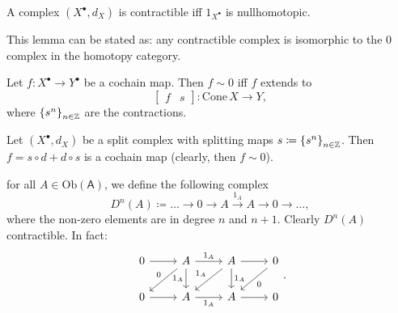 \begin{lem}
	A complex $\left( X^{\bullet}, d_{X} \right)$ is contractible iff
	$1_{X^\bullet}$ is nullhomotopic.
\end{lem}
\begin{rem}[]
	This lemma can be stated as: any contractible complex is isomorphic to
	the $0$ complex in the homotopy category.
\end{rem}

\begin{lem}
	Let $f\colon X^\bullet \to Y^\bullet$ be a cochain map.
	Then $f \sim 0$ iff $f$ extends to
	\begin{equation}
		\begin{bmatrix}
			f & s
		\end{bmatrix} 
		\colon \mathrm{Cone}\, X \to Y
	,\end{equation} 
	where $\left\{ s^n \right\}_{n \in \mathbb{Z}}$ are the contractions.
\end{lem} 

\begin{lem}
	Let $\left( X^{\bullet}, d_{X} \right)$ be a split complex
	with splitting maps $s \coloneqq \left\{ s^n \right\}_{n \in \mathbb{Z}}$.
	Then $f = s \circ d + d \circ s$ is a cochain map (clearly, then $f \sim 0$).
\end{lem} 

\begin{rem}[]
	for all $A \in \mathrm{Ob} \left(\mathsf{A}\right)$, we define the following complex
	\begin{equation}
		D^n(A) \coloneqq 
		\ldots \to 0 \to A \xrightarrow{1_A} A \to 0 \to \ldots
	,\end{equation} 
	where the non-zero elements are in degree $n$ and $n+1$.
	Clearly $D^n(A)$ contractible. In fact:
	\begin{equation}
	\begin{tikzcd}
		0 \arrow[r, "", rightarrow] &
		A \arrow[r, "1_A", rightarrow] \arrow[ld, "0"', rightarrow] \arrow[d, "1_A"', rightarrow] &
		A \arrow[r, "", rightarrow] \arrow[ld, "1_A"', rightarrow] \arrow[d, "1_A", rightarrow] &
		0 \arrow[ld, "0", rightarrow] \\
		0 \arrow[r, "", rightarrow] &
		A \arrow[r, "1_A"', rightarrow] &
		A \arrow[r, "", rightarrow] &
		0 
	\end{tikzcd}
	.\end{equation} 
\end{rem}

